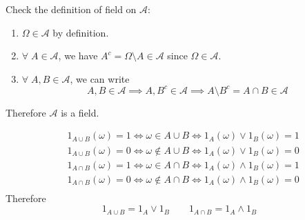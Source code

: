 \begin{list}{1.9.}{}
\item Check the definition of field on $\mathcal{A}$:
  \begin{enumerate}
  \item $\Omega\in\mathcal{A}$ by definition.
  \item $\forall\; A\in\mathcal{A}$, we have $A^c = \Omega \setminus A \in\mathcal{A}$ since $\Omega\in\mathcal{A}$.
  \item $\forall\;A,B\in\mathcal{A}$, we can write
    \[
      A,B\in\mathcal{A} \implies A,B^c\in\mathcal{A} \implies A\setminus B^c = A\cap B \in \mathcal{A}
    \]
  \end{enumerate}
  Therefore $\mathcal{A}$ is a field.
  
\item
  \[
    \begin{aligned}
      & 1_{A\cup B}\left(\omega\right) = 1 \iff \omega\in A\cup B
      \iff 1_A\left(\omega\right) \vee 1_B\left(\omega\right) = 1    \\
      & 1_{A\cup B}\left(\omega\right) = 0 \iff \omega\notin A\cup B
      \iff 1_A\left(\omega\right) \vee 1_B\left(\omega\right) = 0    \\
      & 1_{A\cap B}\left(\omega\right) = 1 \iff \omega\in A\cap B
      \iff 1_A\left(\omega\right) \wedge 1_B\left(\omega\right) = 1    \\
      & 1_{A\cap B}\left(\omega\right) = 0 \iff \omega\notin A\cap B
      \iff 1_A\left(\omega\right) \wedge 1_B\left(\omega\right) = 0    \\
    \end{aligned}
  \]
  Therefore
  \[
    1_{A\cup B} = 1_A \vee 1_B \quad\quad 1_{A \cap B} = 1_A \wedge 1_B
  \]
\end{list}

\clearpage{}
